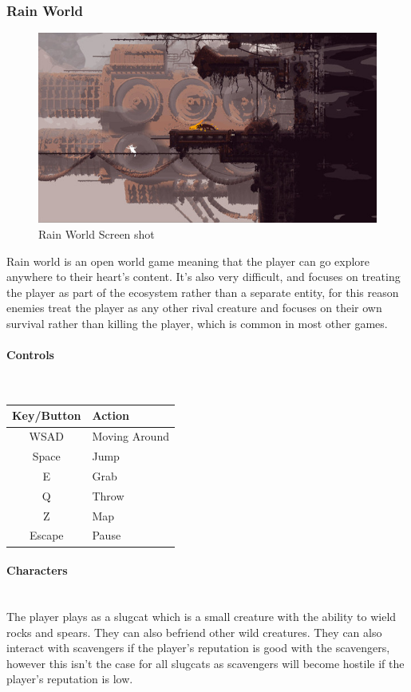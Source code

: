 \documentclass{article}
\newcommand{\myparagraph}[1]{\paragraph{#1}\mbox{}\\} %
\newcommand{\smallBr}{\vspace{1.5mm}}
\begin{document}
\pagebreak

\subsubsection{Rain World}
\begin{figure}[h]
\includegraphics[width=\linewidth]{Rain world ss}
\caption{\cite{RWss} Rain World Screen shot}
\end{figure}
Rain world is an open world game meaning that the player can go explore anywhere to their heart's content. It's also very difficult, and focuses on treating the player as part of the ecosystem rather than a separate entity, for this reason enemies treat the player as any other rival creature and focuses on their own survival rather than killing the player, which is common in most other games.

\myparagraph{Controls}
\smallBr
\begin{tabular}{c|l}
Key/Button & Action        \\ \hline
WSAD       & Moving Around \\
Space      & Jump          \\
E          & Grab          \\
Q          & Throw         \\
Z          & Map           \\
Escape     & Pause        
\end{tabular}

\myparagraph{Characters}
The player plays as a slugcat which is a small creature with the ability to wield rocks and spears. They can also befriend other wild creatures. They can also interact with scavengers if the player's reputation is good with the scavengers, however this isn't the case for all slugcats as scavengers will become hostile if the player's reputation is low. 
\end{document}
